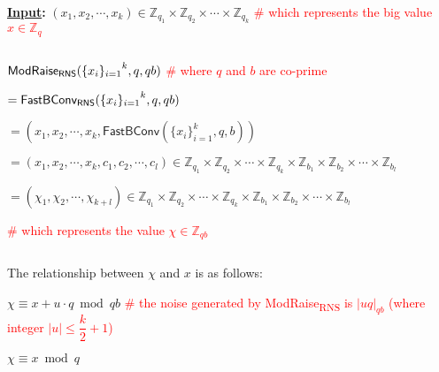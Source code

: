 \begin{tcolorbox}[title={\textbf{\tboxlabel{\ref*{subsec:rns-modraise}} \textsf{ModRaise\textsubscript{RNS}}}}]

\textbf{\underline{Input}:} $(x_1, x_2, \cdots, x_k) \in \mathbb{Z}_{q_1} \times \mathbb{Z}_{q_2} \times \cdots \times \mathbb{Z}_{q_k}$ \textcolor{red}{ \# which represents the big value $x \in \mathbb{Z}_q$}

$ $


$\textsf{ModRaise\textsubscript{RNS}}({\{x_i\}_{i=1}}^k, q, qb)$ \textcolor{red}{ \# where $q$ and $b$ are co-prime}

$= \textsf{FastBConv\textsubscript{RNS}}({\{x_i\}_{i=1}}^k, q, qb)$ 

$ = (x_1, x_2, \cdots, x_k, \textsf{FastBConv}(\{x_i\}_{i=1}^k, q, b))$ 

$ = (x_1, x_2, \cdots, x_k, c_1, c_2, \cdots, c_l) \in \mathbb{Z}_{q_1} \times \mathbb{Z}_{q_2} \times \cdots \times \mathbb{Z}_{q_k} \times \mathbb{Z}_{b_1} \times \mathbb{Z}_{b_2} \times \cdots \times \mathbb{Z}_{b_l}$

$ = (\chi_1, \chi_2, \cdots, \chi_{k+l}) \in \mathbb{Z}_{q_1} \times \mathbb{Z}_{q_2} \times \cdots \times \mathbb{Z}_{q_k} \times \mathbb{Z}_{b_1} \times \mathbb{Z}_{b_2} \times \cdots \times \mathbb{Z}_{b_l}$

\textcolor{red}{ \# which represents the value $\chi \in \mathbb{Z}_{qb}$}

$ $


The relationship between $\chi$ and $x$ is as follows: 

$\chi \equiv x + u\cdot q \bmod qb$ \textcolor{red}{ \# the noise generated by \textsf{ModRaise\textsubscript{RNS}} is $|uq|_{qb}$ (where integer $|u| \leq \dfrac{k}{2}+1$)}

$\chi \equiv x \bmod q$

\end{tcolorbox}


